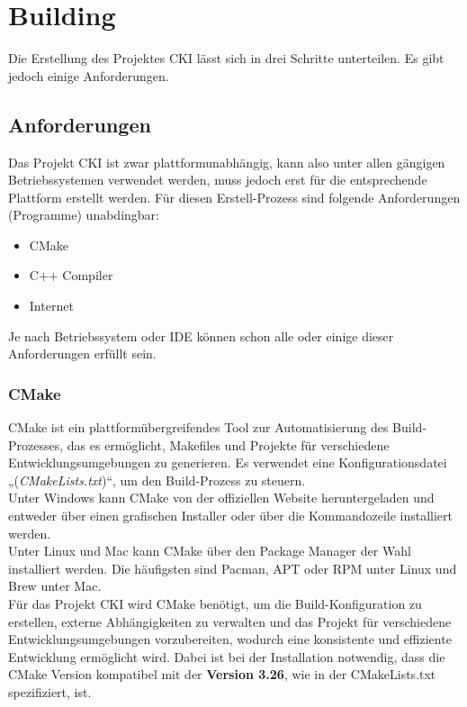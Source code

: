 \section{Building}
Die Erstellung des Projektes CKI lässt sich in drei Schritte unterteilen. Es gibt jedoch einige Anforderungen.
\subsection{Anforderungen}
\label{sec:BuildAnforderungen}
Das Projekt CKI ist zwar plattformunabhängig, kann also unter allen gängigen Betriebssystemen verwendet werden, muss jedoch erst für die entsprechende Plattform erstellt werden. Für diesen Erstell-Prozess sind folgende Anforderungen (Programme) unabdingbar:
\begin{itemize}
	\item CMake
	\item C++ Compiler
	\item Internet
\end{itemize}
Je nach Betriebssystem oder IDE können schon alle oder einige dieser Anforderungen erfüllt sein.

\subsubsection{CMake}
\label{sec:BuildCMake}
CMake ist ein plattformübergreifendes Tool zur Automatisierung des Build-Prozesses, das es ermöglicht, Makefiles und Projekte für verschiedene Entwicklungsumgebungen zu generieren. Es verwendet eine Konfigurationsdatei „(\textit{CMakeLists.txt})“, um den Build-Prozess zu steuern. 
\\
Unter Windows kann CMake von der offiziellen Website heruntergeladen und entweder über einen grafischen Installer oder über die Kommandozeile installiert werden.
\\
Unter Linux und Mac kann CMake über den Package Manager der Wahl installiert werden. Die häufigsten sind Pacman, APT oder RPM unter Linux und Brew unter Mac.
\\
Für das Projekt CKI wird CMake benötigt, um die Build-Konfiguration zu erstellen, externe Abhängigkeiten zu verwalten und das Projekt für verschiedene Entwicklungsumgebungen vorzubereiten, wodurch eine konsistente und effiziente Entwicklung ermöglicht wird. Dabei ist bei der Installation notwendig, dass die CMake Version kompatibel mit der \textbf{Version 3.26}, wie in der CMakeLists.txt spezifiziert, ist.

